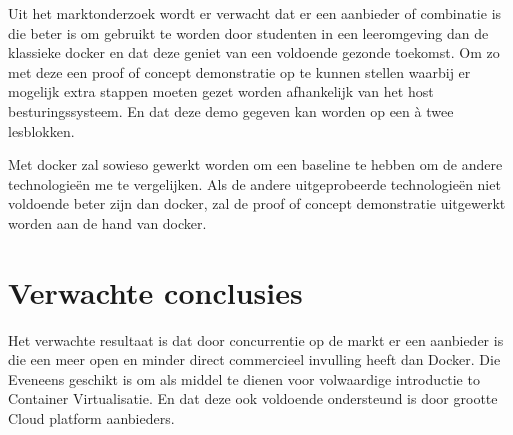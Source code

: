 Uit het marktonderzoek wordt er verwacht dat er een aanbieder of combinatie is die beter is om gebruikt te worden door studenten in een leeromgeving dan de klassieke docker en dat deze geniet van een voldoende gezonde toekomst.  Om zo met deze een proof of concept demonstratie op te kunnen stellen waarbij er mogelijk extra stappen moeten gezet worden afhankelijk van het host besturingssysteem. En dat deze demo gegeven kan worden op een à twee lesblokken.
 
Met docker zal sowieso gewerkt worden om een baseline te hebben om de andere technologieën me te vergelijken. Als de andere uitgeprobeerde technologieën niet voldoende beter zijn dan docker,  zal de proof of concept demonstratie uitgewerkt worden aan de hand van docker. 


\section{Verwachte conclusies}
\label{sec:verwachte_conclusies}

Het verwachte resultaat is dat door concurrentie op de markt er een aanbieder is die een meer open en minder direct commercieel invulling heeft dan Docker. Die Eveneens geschikt is om als middel te dienen voor volwaardige introductie to Container Virtualisatie. En dat deze ook voldoende ondersteund is door grootte Cloud platform aanbieders.  

